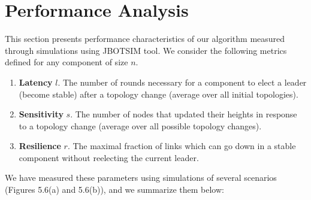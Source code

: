 \section{Performance Analysis}

This section presents performance characteristics of our algorithm measured through simulations using JBOTSIM\cite{31} tool. We consider the following metrics defined for any component of size $n$.

\begin{enumerate}
	\item \textbf{Latency} $l$. The number of rounds necessary for a component to elect a leader (become stable) after a topology change (average over all initial topologies).
	
	\item \textbf{Sensitivity} $s$. The number of nodes that updated their heights in response to a topology change (average over all possible topology changes).
	
	\item \textbf{Resilience} $r$. The maximal fraction of links which can go down in a stable component without reelecting the current leader.
	
\end{enumerate}

We have measured these parameters using simulations of several scenarios (Figures 5.6(a) and 5.6(b)), and we summarize them below:

